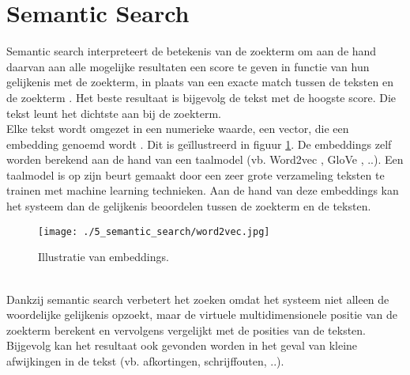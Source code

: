 \section{Semantic Search}
Semantic search interpreteert de betekenis van de zoekterm om aan de hand daarvan aan alle mogelijke resultaten een score te geven in functie van hun gelijkenis met de zoekterm, in plaats van een exacte match tussen de teksten en de zoekterm \autocite{Bast2016}. Het beste resultaat is bijgevolg de tekst met de hoogste score. Die tekst leunt het dichtste aan bij de zoekterm.\\
Elke tekst wordt omgezet in een numerieke waarde, een vector, die een embedding genoemd wordt
\autocite{Almeida2019}. Dit is geïllustreerd in figuur \ref{fig:Word2vec}. De embeddings zelf worden berekend aan de hand van een taalmodel (vb. Word2vec \autocite{Word2vec2025}, GloVe \autocite{Glove2025}, ..). Een taalmodel is op zijn beurt gemaakt door een zeer grote verzameling teksten te trainen met machine learning technieken. Aan de hand van deze embeddings kan het systeem dan de gelijkenis beoordelen tussen de zoekterm en de teksten.
\begin{figure}
    \centering
    \texttt{[image: ./5\_semantic\_search/word2vec.jpg]}
    \caption[Illustratie van embeddings.]{\label{fig:Word2vec}Illustratie van embeddings.}
\end{figure}\\
Dankzij semantic search verbetert het zoeken omdat het systeem niet alleen de woordelijke gelijkenis opzoekt, maar de virtuele multidimensionele positie van de zoekterm berekent en vervolgens vergelijkt met de posities van de teksten. Bijgevolg kan het resultaat ook gevonden worden in het geval van kleine afwijkingen in de tekst (vb. afkortingen, schrijffouten, ..). 




